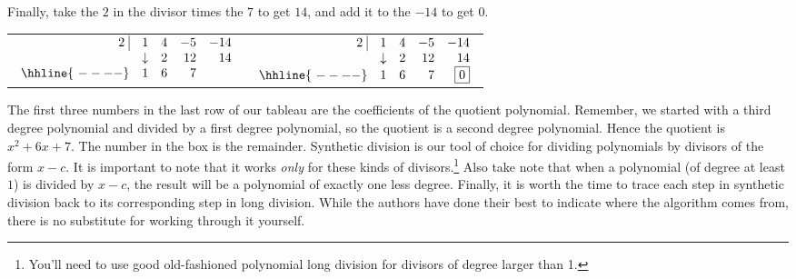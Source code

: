Finally, take the $2$ in the divisor times the $7$ to get $14$, and add it to the $-14$ to get $0$.

\bigskip

\begin{center}

\begin{tabular}{cc}

$ \begin{array}{rrrrr}


  2 \, \, \vline& 1 & 4 & -5  & -14 \\

   & \downarrow &  2  &  12  & 14 \\ \hhline{~----} 
  & 1  &   6  & 7  &    \\  
\end{array}$ \hspace{1in} 

&

$ \begin{array}{rrrrr}


  2 \, \, \vline& 1 & 4 & -5  & -14 \\

   & \downarrow &  2  &  12  & 14 \\ \hhline{~----} 
  & 1  &   6  & 7  &  \fbox{$0$}  \\  
\end{array}$ \\



\end{tabular}

\end{center}

The first three numbers in the last row of our tableau are the coefficients of the quotient polynomial.  Remember, we started with a third degree polynomial and divided by a first degree polynomial, so the quotient is a second degree polynomial.  Hence the quotient is $x^2+6x+7$.  The number in the box is the remainder.  Synthetic division is our tool of choice for dividing polynomials by divisors of the form $x-c$.  It is important to note that it works \emph{only} for these kinds of divisors.\footnote{You'll need to use good old-fashioned polynomial long division for divisors of degree larger than 1.} Also take note that when a polynomial (of degree at least $1$) is divided by $x-c$, the result will be a polynomial of exactly one less degree. Finally, it is  worth the time to trace each step in synthetic division back to its corresponding step in long division.  While the authors have done their best to indicate where the algorithm comes from, there is no substitute for working through it yourself.

